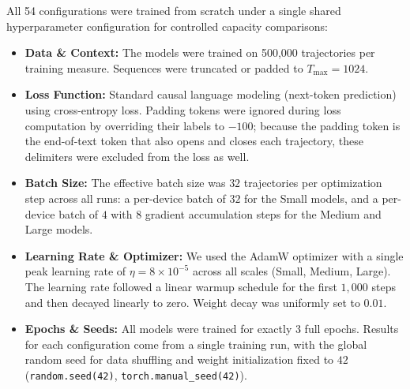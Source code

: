 All 54 configurations were trained from scratch under a single shared hyperparameter configuration for controlled capacity comparisons:
\begin{itemize}
    \item \textbf{Data \& Context:} The models were trained on 500,000 trajectories per training measure. Sequences were truncated or padded to $T_{\max} = 1024$.
    \item \textbf{Loss Function:} Standard causal language modeling (next-token prediction) using cross-entropy loss. Padding tokens were ignored during loss computation by overriding their labels to $-100$; because the padding token is the end-of-text token that also opens and closes each trajectory, these delimiters were excluded from the loss as well.
    \item \textbf{Batch Size:} The effective batch size was $32$ trajectories per optimization step across all runs: a per-device batch of $32$ for the Small models, and a per-device batch of $4$ with $8$ gradient accumulation steps for the Medium and Large models.

    \item \textbf{Learning Rate \& Optimizer:} We used the AdamW optimizer with a single peak learning rate of $\eta = 8 \times 10^{-5}$ across all scales (Small, Medium, Large). The learning rate followed a linear warmup schedule for the first $1{,}000$ steps and then decayed linearly to zero. %
 Weight decay was uniformly set to $0.01$.
    \item \textbf{Epochs \& Seeds:} All models were trained for exactly 3 full epochs. Results for each configuration come from a single training run, with the global random seed for data shuffling and weight initialization fixed to $42$ (\texttt{random.seed(42)}, \texttt{torch.manual\_seed(42)}).
\end{itemize}

